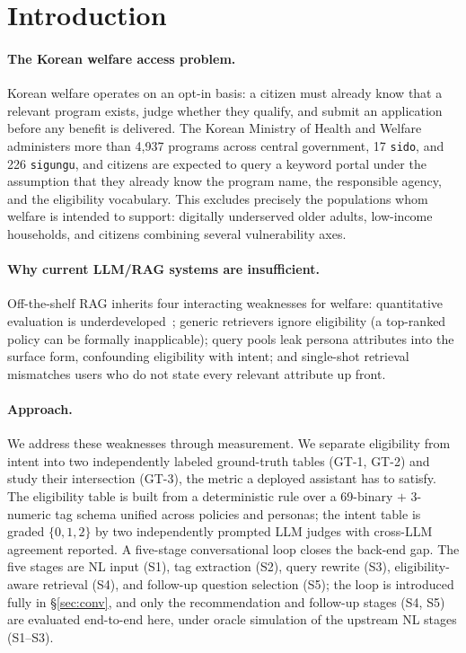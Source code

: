 \documentclass{article}
\newcommand{\npolicy}{4{,}937}
\newcommand{\ndim}{69}
\begin{document}
\section{Introduction}
\label{sec:intro}

\paragraph{The Korean welfare access problem.}
Korean welfare operates on an opt-in basis: a citizen must already
know that a relevant program exists, judge whether they qualify, and
submit an application before any benefit is delivered. The Korean
Ministry of Health and Welfare administers more than \npolicy{}
programs across central government, 17 \texttt{sido}, and 226
\texttt{sigungu}, and citizens are expected to query a keyword portal
under the assumption that they already know the program name, the
responsible agency, and the eligibility vocabulary. This excludes
precisely the populations whom welfare is intended to support:
digitally underserved older adults, low-income households, and
citizens combining several vulnerability axes.

\paragraph{Why current LLM/RAG systems are insufficient.}
Off-the-shelf RAG inherits four interacting weaknesses for
welfare: quantitative evaluation is
underdeveloped~\citep{kim_2024_govt_scheme_rag,alam_2024_sage_health};
generic retrievers ignore eligibility (a top-ranked policy can be
formally inapplicable); query pools leak persona attributes into
the surface form, confounding eligibility with intent; and
single-shot retrieval mismatches users who do not state every
relevant attribute up front.

\paragraph{Approach.}
We address these weaknesses through measurement. We separate
eligibility from intent into two independently labeled ground-truth
tables (GT-1, GT-2) and study their intersection (GT-3), the metric a
deployed assistant has to satisfy. The eligibility table is built
from a deterministic rule over a \ndim{}-binary $+$ 3-numeric tag
schema unified across policies and personas; the intent table is
graded $\{0,1,2\}$ by two independently prompted LLM judges with
cross-LLM agreement reported. A five-stage conversational loop closes
the back-end gap. The five stages are NL input (S1), tag extraction
(S2), query rewrite (S3), eligibility-aware retrieval (S4), and
follow-up question selection (S5); the loop is introduced fully in
\S\ref{sec:conv}, and only the recommendation and follow-up stages
(S4, S5) are evaluated end-to-end here, under oracle simulation of
the upstream NL stages (S1--S3).
\end{document}
